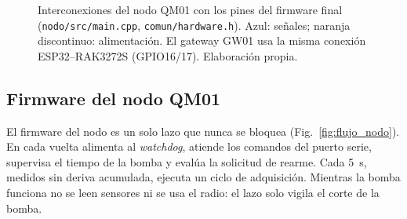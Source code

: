 \begin{figure}[htbp]
{%
}
\caption{Interconexiones del nodo QM01 con los pines del firmware final (\texttt{nodo/src/main.cpp}, \texttt{comun/hardware.h}). Azul: señales; naranja discontinuo: alimentación. El gateway GW01 usa la misma conexión ESP32--RAK3272S (GPIO16/17). Elaboración propia.}
\label{fig:interconexiones}
\end{figure}

\subsection{Firmware del nodo QM01}
\label{sec:fw_nodo}

El firmware del nodo es un solo lazo que nunca se bloquea (Fig.~\ref{fig:flujo_nodo}). En cada vuelta alimenta al \textit{watchdog}, atiende los comandos del puerto serie, supervisa el tiempo de la bomba y evalúa la solicitud de rearme. Cada 5~s, medidos sin deriva acumulada, ejecuta un ciclo de adquisición. Mientras la bomba funciona no se leen sensores ni se usa el radio: el lazo solo vigila el corte de la bomba.

